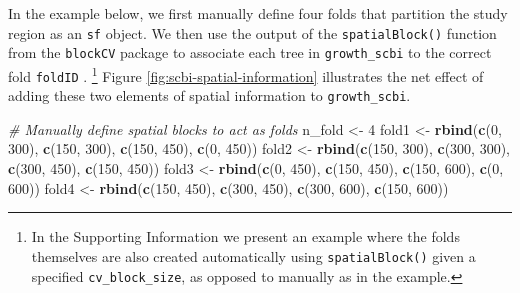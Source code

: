 \documentclass[12pt]{article}
\newenvironment{Shaded}{\begin{snugshade}}{\end{snugshade}}
\newcommand{\CommentTok}[1]{\textcolor[rgb]{0.56,0.35,0.01}{\textit{#1}}}
\newcommand{\DecValTok}[1]{\textcolor[rgb]{0.00,0.00,0.81}{#1}}
\newcommand{\KeywordTok}[1]{\textcolor[rgb]{0.13,0.29,0.53}{\textbf{#1}}}
\newcommand{\NormalTok}[1]{#1}
\newcommand{\StringTok}[1]{\textcolor[rgb]{0.31,0.60,0.02}{#1}}
\begin{document}
In the example below, we first manually define four folds that partition
the study region as an \texttt{sf} object. We then use the output of the
\texttt{spatialBlock()} function from the \texttt{blockCV} package to
associate each tree in \texttt{growth\_scbi} to the correct fold
\texttt{foldID} \citep{valavi_blockcv_2019}. \footnote{In the Supporting
  Information we present an example where the folds themselves are also
  created automatically using \texttt{spatialBlock()} given a specified
  \texttt{cv\_block\_size}, as opposed to manually as in the example.}
Figure \ref{fig:scbi-spatial-information} illustrates the net effect of
adding these two elements of spatial information to
\texttt{growth\_scbi}.

\begin{Shaded}
\begin{Highlighting}[]
\CommentTok{# Manually define spatial blocks to act as folds}
\NormalTok{n_fold <-}\StringTok{ }\DecValTok{4}
\NormalTok{fold1 <-}\StringTok{ }\KeywordTok{rbind}\NormalTok{(}\KeywordTok{c}\NormalTok{(}\DecValTok{0}\NormalTok{, }\DecValTok{300}\NormalTok{), }\KeywordTok{c}\NormalTok{(}\DecValTok{150}\NormalTok{, }\DecValTok{300}\NormalTok{), }\KeywordTok{c}\NormalTok{(}\DecValTok{150}\NormalTok{, }\DecValTok{450}\NormalTok{), }\KeywordTok{c}\NormalTok{(}\DecValTok{0}\NormalTok{, }\DecValTok{450}\NormalTok{))}
\NormalTok{fold2 <-}\StringTok{ }\KeywordTok{rbind}\NormalTok{(}\KeywordTok{c}\NormalTok{(}\DecValTok{150}\NormalTok{, }\DecValTok{300}\NormalTok{), }\KeywordTok{c}\NormalTok{(}\DecValTok{300}\NormalTok{, }\DecValTok{300}\NormalTok{), }\KeywordTok{c}\NormalTok{(}\DecValTok{300}\NormalTok{, }\DecValTok{450}\NormalTok{), }\KeywordTok{c}\NormalTok{(}\DecValTok{150}\NormalTok{, }\DecValTok{450}\NormalTok{))}
\NormalTok{fold3 <-}\StringTok{ }\KeywordTok{rbind}\NormalTok{(}\KeywordTok{c}\NormalTok{(}\DecValTok{0}\NormalTok{, }\DecValTok{450}\NormalTok{), }\KeywordTok{c}\NormalTok{(}\DecValTok{150}\NormalTok{, }\DecValTok{450}\NormalTok{), }\KeywordTok{c}\NormalTok{(}\DecValTok{150}\NormalTok{, }\DecValTok{600}\NormalTok{), }\KeywordTok{c}\NormalTok{(}\DecValTok{0}\NormalTok{, }\DecValTok{600}\NormalTok{))}
\NormalTok{fold4 <-}\StringTok{ }\KeywordTok{rbind}\NormalTok{(}\KeywordTok{c}\NormalTok{(}\DecValTok{150}\NormalTok{, }\DecValTok{450}\NormalTok{), }\KeywordTok{c}\NormalTok{(}\DecValTok{300}\NormalTok{, }\DecValTok{450}\NormalTok{), }\KeywordTok{c}\NormalTok{(}\DecValTok{300}\NormalTok{, }\DecValTok{600}\NormalTok{), }\KeywordTok{c}\NormalTok{(}\DecValTok{150}\NormalTok{, }\DecValTok{600}\NormalTok{))}


\end{Highlighting}
\end{Shaded}
\end{document}
